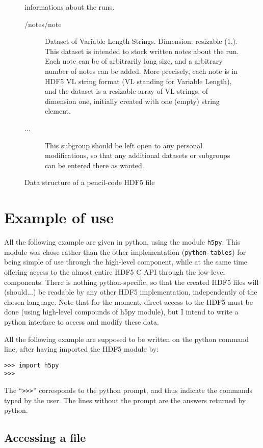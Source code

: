 \documentclass[a4paper,12pt]{article}
\begin{document}
\begin{figure}[p]
{\begin{description}
\begin{description}
    informations about the runs.
    \begin{description}
    \item[/notes/note] Dataset of Variable Length Strings. Dimension:
      resizable (1,). This dataset is intended to stock written notes
      about the run. Each note can be of arbitrarily long size, and a
      arbitrary number of notes can be added. More precisely, each
      note is in HDF5 VL string format (VL standing for Variable
      Length), and the dataset is a resizable array of VL strings, of
      dimension one, initially created with one (empty) string
      element.
    \item[...] This subgroup should be left open to any personal
      modifications, so that any additional datasets or subgroups can
      be entered there as wanted.
    \end{description}
  \end{description}
\end{description}
}%
\caption{Data structure of a pencil-code HDF5 file}
\label{fig:data-struct}
\end{figure}
\section{Example of use}
\label{sec:example-use}

All the following example are given in python, using the module
\texttt{h5py}. This module was chose rather than the other
implementation (\texttt{python-tables}) for being simple of use
through the high-level component, while at the same time offering
access  to the almost entire HDF5 C API through the low-level
components. There is nothing python-specific, so that the created
HDF5 files will (should...) be readable by any other HDF5
implementation, independently of the chosen language. Note that for
the moment, direct access to the HDF5 must be done (using high-level
compounds of h5py module), but I intend to write a python interface to
access and modify these data. 

All the following example are supposed to be written on the python
command line, after having imported the HDF5 module by:
\begin{verbatim}
>>> import h5py
>>>
\end{verbatim}
The ``\texttt{>>>}'' corresponds to the python prompt, and thus indicate
the commands typed by the user. The lines without the prompt are the
answers returned by python.


\subsection{Accessing a file}
\label{sec:opening-file}
\end{document}
